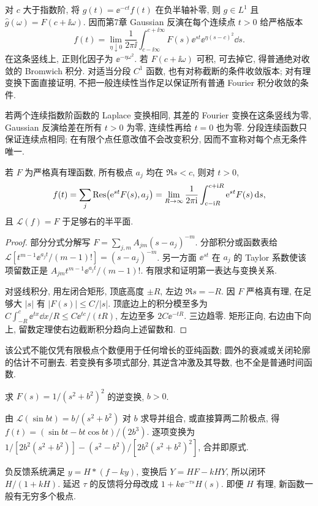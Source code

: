 对 $c$ 大于指数阶, 将 $g(t)=\ee^{-ct}f(t)$ 在负半轴补零, 则 $g\in L^1$ 且 $\widehat g(\omega)=F(c+\ii\omega)$. 因而第7章 Gaussian 反演在每个连续点 $t>0$ 给严格版本
\[
f(t)=\lim_{\eta\downarrow0}\frac1{2\pi\ii}
\int_{c-\ii\infty}^{c+\ii\infty}F(s)\ee^{st}\ee^{\eta(s-c)^2}\dd s.
\]
在这条竖线上, 正则化因子为 $\ee^{-\eta\omega^2}$. 若 $F(c+\ii\omega)$ 可积, 可去掉它, 得普通绝对收敛的 Bromwich 积分. 对适当分段 $C^1$ 函数, 也有对称截断的条件收敛版本; 对有理变换下面直接证明, 不把一般连续性当作足以保证所有普通 Fourier 积分收敛的条件.

若两个连续指数阶函数的 Laplace 变换相同, 其差的 Fourier 变换在这条竖线为零, Gaussian 反演给差在所有 $t>0$ 为零, 连续性再给 $t=0$ 也为零. 分段连续函数只保证连续点相同; 在有限个点任意改值不会改变积分, 因而不宣称对每个点无条件唯一.
\begin{theorem}[有理变换的留数反演]\label{thm:laplaceres}
若 $F$ 为严格真有理函数, 所有极点 $a_j$ 均在 $\Re s<c$, 则对 $t>0$,
\[
f(t)=\sum_j\operatorname{Res}\bigl(\mathrm e^{st}F(s),a_j\bigr)
 =\lim_{R\to\infty}\frac1{2\pi\mathrm i}\int_{c-\mathrm i R}^{c+\mathrm i R}\mathrm e^{st}F(s)\,\mathrm d s,
\]
且 $\mathcal L(f)=F$ 于足够右的半平面.
\end{theorem}
\begin{proof}
部分分式分解写 $F=\sum_{j,m}A_{jm}(s-a_j)^{-m}$. 分部积分或函数表给 $\mathcal L[t^{m-1}\ee^{a_jt}/(m-1)!]=(s-a_j)^{-m}$. 另一方面 $\ee^{st}$ 在 $a_j$ 的 Taylor 系数使该项留数正是 $A_{jm}t^{m-1}\ee^{a_jt}/(m-1)!$. 有限求和证明第一表达与变换关系.

对竖线积分, 用左闭合矩形, 顶底高度 $\pm R$, 左边 $\Re s=-R$. 因 $F$ 严格真有理, 在足够大 $|s|$ 有 $|F(s)|\le C/|s|$. 顶底边上的积分模至多为 $C\int_{-R}^c\ee^{tx}\dd x/R\le C\ee^{tc}/(tR)$, 左边至多 $2C\ee^{-tR}$. 三边趋零. 矩形正向, 右边由下向上, 留数定理使右边截断积分趋向上述留数和.
\end{proof}
该公式不能仅凭有限极点个数便用于任何增长的亚纯函数; 圆外的衰减或关闭轮廓的估计不可删去. 若变换有多项式部分, 其逆含冲激及其导数, 也不全是普通时间函数.
\begin{example}
求 $F(s)=1/(s^2+b^2)^2$ 的逆变换, $b>0$.
\end{example}
\begin{solution}
由 $\mathcal L(\sin bt)=b/(s^2+b^2)$ 对 $b$ 求导并组合, 或直接算两二阶极点, 得 $f(t)=(\sin bt-bt\cos bt)/(2b^3)$. 逐项变换为 $1/[2b^2(s^2+b^2)]-(s^2-b^2)/[2b^2(s^2+b^2)^2]$, 合并即原式.
\end{solution}

负反馈系统满足 $y=H*(f-k y)$, 变换后 $Y=HF-kHY$, 所以闭环 $H/(1+kH)$. 延迟 $\tau$ 的反馈将分母改成 $1+k\ee^{-\tau s}H(s)$. 即便 $H$ 有理, 新函数一般有无穷多个极点.

